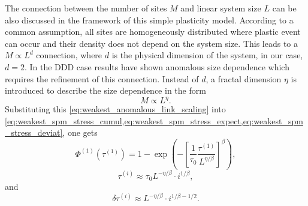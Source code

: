 The connection between the number of sites $M$ and linear system size $L$ can be also discussed in the framework of this simple plasticity model. According to a common assumption, all sites are homogeneously distributed where plastic event can occur and their density does not depend on the system size. This leads to a $M \propto {L^d}$ connection, where $d$ is the physical dimension of  the system, in our case, $d=2$. In the DDD case results have shown anomalous size dependence which requires the refinement of this connection. Instead of $d$, a fractal dimension $\eta$ is introduced to describe the size dependence in the form
\begin{equation} \label{eq:weakest_anomalous_link_scaling}
M \propto L^\eta.
\end{equation}
Substituting this \cref{eq:weakest_anomalous_link_scaling} into \cref{eq:weakest_spm_stress_cumul,eq:weakest_spm_stress_expect,eq:weakest_spm_stress_deviat}, one gets
\begin{equation}
{\Phi ^{\left( 1 \right)}}\left( {{\tau ^{\left( 1 \right)}}} \right) =  1 - \exp \left( { - {{\left[ {\frac{1}{{{\tau _0}}}\frac{{{\tau ^{\left( 1 \right)}}}}{{{L^{\eta /\beta }}}}} \right]}^\beta }} \right),
\end{equation}
\begin{equation}
{\tau ^{\left( i \right)}} \approx  {\tau _0}{L^{ - \eta /\beta }} \cdot {i^{1/\beta }},
\end{equation}
and
\begin{equation}
\delta {\tau ^{\left( i \right)}} \approx  {L^{ - \eta /\beta }} \cdot {i^{1/\beta  - 1/2}}.
\end{equation}


